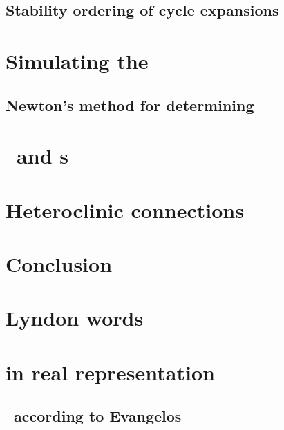\documentclass[hyperref]{inputs/gatech-thesis}
\begin{document}
    \section{Stability ordering of cycle expansions}
        \label{s-StabOrd}
         



\chapter{Simulating the \KSe}
\label{chap:Numerics}
    \section{Newton's method for determining \reqva}
        


\chapter{\Eqva\ and \po s}

\chapter{Heteroclinic connections}

\chapter{Conclusion}



\appendix

\chapter{Lyndon words}


\chapter{\KSe in real representation}

\section{\KSe\ according to Evangelos}

\end{document}
